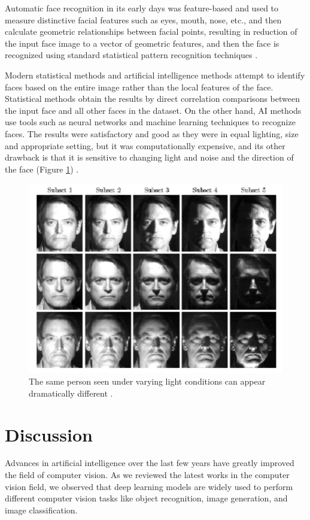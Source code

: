 \documentclass[12pt,twocolumn,a4paper]{article}
\begin{document}
    Automatic face recognition in its early days was feature-based and used to measure distinctive facial features such as eyes, mouth, nose, etc., and then calculate geometric relationships between facial points, resulting in reduction of the input face image to a vector of geometric features, and then the face is recognized using standard statistical pattern recognition techniques \cite{10.3745/JIPS.2009.5.2.041}.

    Modern statistical methods and artificial intelligence methods attempt to identify faces based on the entire image rather than the local features of the face. Statistical methods obtain the results by direct correlation comparisons between the input face and all other faces in the dataset. On the other hand, AI methods use tools such as neural networks and machine learning techniques to recognize faces. The results were satisfactory and good as they were in equal lighting, size and appropriate setting, but it was computationally expensive, and its other drawback is that it is sensitive to changing light and noise and the direction of the face (Figure \ref{fig:dd}) \cite{10.3745/JIPS.2009.5.2.041}.

    \begin{figure}[htp]
        \centering
        \includegraphics[scale=0.2]{face.png}
        \caption{\centering The same person seen under varying light 
conditions can appear dramatically different \cite{10.3745/JIPS.2009.5.2.041}.}
        \label{fig:dd}
    \end{figure}
    
    \section{Discussion}
    \hspace{0.3cm} Advances in artificial intelligence over the last few years have greatly improved the field of computer vision. As we reviewed the latest works in the computer vision field, we observed that deep learning models are widely used to perform different computer vision tasks like object recognition, image generation, and image classification. 
\end{document}
